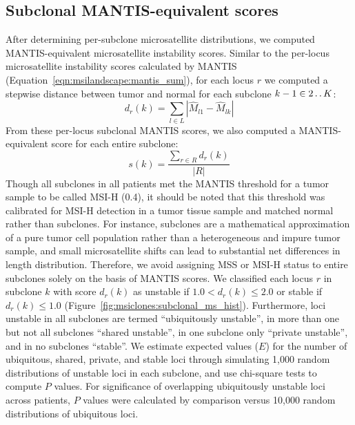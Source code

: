 \subsection{Subclonal MANTIS-equivalent scores}
\label{ssec:msiclones:mantis_equiv_scores}
After determining per-subclone microsatellite distributions, we computed MANTIS-\linebreak{}equivalent microsatellite instability scores. Similar to the per-locus microsatellite instability scores calculated by MANTIS (Equation~\ref{eqn:msilandscape:mantis_sum}), for each locus $r$ we computed a stepwise distance between tumor and normal for each subclone $k-1 \in 2 \mathinner {\ldotp \ldotp} K$:
\begin{equation}
    d_r(k) = \sum_{l \in L}|\hat{M}_{l1} - \hat{M}_{lk}|
\end{equation}
From these per-locus subclonal MANTIS scores, we also computed a MANTIS-equivalent score for each entire subclone:
\begin{equation}
    s(k) = \frac{\sum_{r \in R} d_r(k)}{|R|}
\end{equation}
Though all subclones in all patients met the MANTIS threshold for a tumor sample to be called MSI-H (0.4), it should be noted that this threshold was calibrated for MSI-H detection in a tumor tissue sample and matched normal rather than subclones. For instance, subclones are a mathematical approximation of a pure tumor cell population rather than a heterogeneous and impure tumor sample, and small microsatellite shifts can lead to substantial net differences in length distribution. Therefore, we avoid assigning MSS or MSI-H status to entire subclones solely on the basis of MANTIS scores. We classified each locus $r$ in subclone $k$ with score $d_r(k)$ as unstable if $1.0 < d_r(k) \le 2.0$ or stable if $d_r(k) \le 1.0$ (Figure~\ref{fig:msiclones:subclonal_ms_hist}). Furthermore, loci unstable in all subclones are termed ``ubiquitously unstable'', in more than one but not all subclones ``shared unstable'', in one subclone only ``private unstable'', and in no subclones ``stable''. We estimate expected values ($E$) for the number of ubiquitous, shared, private, and stable loci through simulating 1,000 random distributions of unstable loci in each subclone, and use chi-square tests to compute $P$ values. For significance of overlapping ubiquitously unstable loci across patients, $P$ values were calculated by comparison versus 10,000 random distributions of ubiquitous loci.
